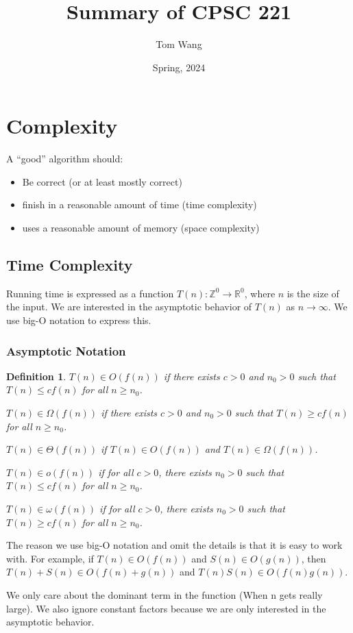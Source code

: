 \documentclass[letterpaper,12pt]{article}
\title{Summary of CPSC 221}
\author{Tom Wang}
\date{Spring, 2024}
\newtheorem{definition}{Definition}
\begin{document}
\maketitle
\section{Complexity}
A ``good'' algorithm should:\begin{itemize}
    \item Be correct (or at least mostly correct)
    \item finish in a reasonable amount of time (time complexity)
    \item uses a reasonable amount of memory (space complexity)
\end{itemize}

\subsection{Time Complexity}
Running time is expressed as a function $T(n):\mathbb{Z}^0 \to \mathbb{R}^0$, where $n$ is the size of the input. We are interested in the asymptotic behavior of $T(n)$ as $n\to \infty$. We use big-O notation to express this.
\subsubsection{Asymptotic Notation}
\begin{definition}

    $T(n)\in O(f(n))$ if there exists $c>0$ and $n_0>0$ such that $T(n)\leq cf(n)$ for all $n\geq n_0$.

    $T(n)\in \Omega(f(n))$ if there exists $c>0$ and $n_0>0$ such that $T(n)\geq cf(n)$ for all $n\geq n_0$.

    $T(n)\in \Theta(f(n))$ if $T(n)\in O(f(n))$ and $T(n)\in \Omega(f(n))$.

    $T(n)\in o(f(n))$ if for all $c>0$, there exists $n_0>0$ such that $T(n)\leq cf(n)$ for all $n\geq n_0$.

    $T(n)\in \omega(f(n))$ if for all $c>0$, there exists $n_0>0$ such that $T(n)\geq cf(n)$ for all $n\geq n_0$.
\end{definition}

The reason we use big-O notation and omit the details is that it is easy to work with. For example, if $T(n)\in O(f(n))$ and $S(n)\in O(g(n))$, then $T(n)+S(n)\in O(f(n)+g(n))$ and $T(n)S(n)\in O(f(n)g(n))$.

We only care about the dominant term in the function (When n gets really large). We also ignore constant factors because we are only interested in the asymptotic behavior.
\end{document}
